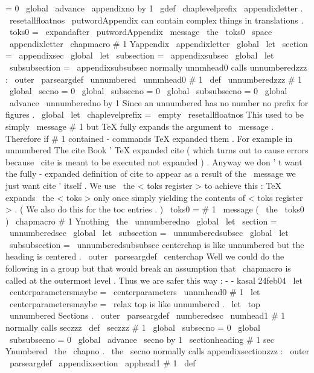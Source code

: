 {{{{{=
0
\
global
\
advance
\
appendixno
by
1
\
gdef
\
chaplevelprefix
{
\
appendixletter
.
}
%
\
resetallfloatnos
%
%
\
putwordAppendix
can
contain
complex
things
in
translations
.
\
toks0
=
\
expandafter
{
\
putwordAppendix
}
%
\
message
{
\
the
\
toks0
\
space
\
appendixletter
}
%
%
\
chapmacro
{
#
1
}
{
Yappendix
}
{
\
appendixletter
}
%
%
\
global
\
let
\
section
=
\
appendixsec
\
global
\
let
\
subsection
=
\
appendixsubsec
\
global
\
let
\
subsubsection
=
\
appendixsubsubsec
}
%
normally
unnmhead0
calls
unnumberedzzz
:
\
outer
\
parseargdef
\
unnumbered
{
\
unnmhead0
{
#
1
}
}
\
def
\
unnumberedzzz
#
1
{
%
\
global
\
secno
=
0
\
global
\
subsecno
=
0
\
global
\
subsubsecno
=
0
\
global
\
advance
\
unnumberedno
by
1
%
%
Since
an
unnumbered
has
no
number
no
prefix
for
figures
.
\
global
\
let
\
chaplevelprefix
=
\
empty
\
resetallfloatnos
%
%
This
used
to
be
simply
\
message
{
#
1
}
but
TeX
fully
expands
the
%
argument
to
\
message
.
Therefore
if
#
1
contained
-
commands
TeX
%
expanded
them
.
For
example
in
unnumbered
The
cite
{
Book
}
'
TeX
%
expanded
cite
(
which
turns
out
to
cause
errors
because
\
cite
is
meant
%
to
be
executed
not
expanded
)
.
%
%
Anyway
we
don
'
t
want
the
fully
-
expanded
definition
of
cite
to
appear
%
as
a
result
of
the
\
message
we
just
want
cite
'
itself
.
We
use
%
\
the
<
toks
register
>
to
achieve
this
:
TeX
expands
\
the
<
toks
>
only
once
%
simply
yielding
the
contents
of
<
toks
register
>
.
(
We
also
do
this
for
%
the
toc
entries
.
)
\
toks0
=
{
#
1
}
%
\
message
{
(
\
the
\
toks0
)
}
%
%
\
chapmacro
{
#
1
}
{
Ynothing
}
{
\
the
\
unnumberedno
}
%
%
\
global
\
let
\
section
=
\
unnumberedsec
\
global
\
let
\
subsection
=
\
unnumberedsubsec
\
global
\
let
\
subsubsection
=
\
unnumberedsubsubsec
}
%
centerchap
is
like
unnumbered
but
the
heading
is
centered
.
\
outer
\
parseargdef
\
centerchap
{
%
%
Well
we
could
do
the
following
in
a
group
but
that
would
break
%
an
assumption
that
\
chapmacro
is
called
at
the
outermost
level
.
%
Thus
we
are
safer
this
way
:
-
-
kasal
24feb04
\
let
\
centerparametersmaybe
=
\
centerparameters
\
unnmhead0
{
#
1
}
%
\
let
\
centerparametersmaybe
=
\
relax
}
%
top
is
like
unnumbered
.
\
let
\
top
\
unnumbered
%
Sections
.
%
\
outer
\
parseargdef
\
numberedsec
{
\
numhead1
{
#
1
}
}
%
normally
calls
seczzz
\
def
\
seczzz
#
1
{
%
\
global
\
subsecno
=
0
\
global
\
subsubsecno
=
0
\
global
\
advance
\
secno
by
1
\
sectionheading
{
#
1
}
{
sec
}
{
Ynumbered
}
{
\
the
\
chapno
.
\
the
\
secno
}
%
}
%
normally
calls
appendixsectionzzz
:
\
outer
\
parseargdef
\
appendixsection
{
\
apphead1
{
#
1
}
}
\
def
}}}}
